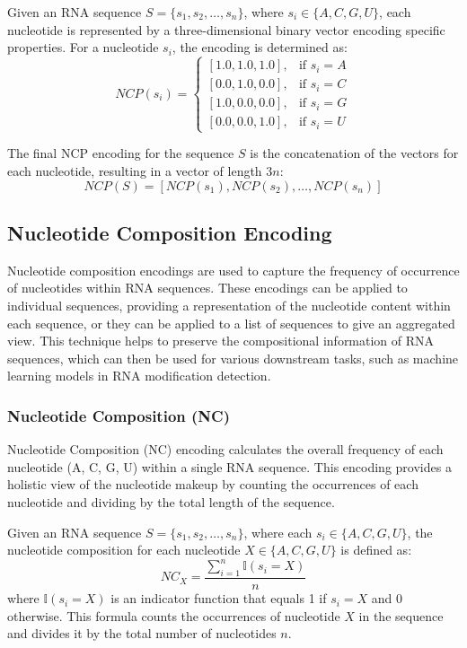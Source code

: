     Given an RNA sequence $S = \{s_1, s_2, \dots, s_n\}$, where $s_i \in \{A, C, G, U\}$, each nucleotide is represented by a three-dimensional binary vector encoding specific properties. For a nucleotide $s_i$, the encoding is determined as:
    \[
      NCP(s_i) = \begin{cases}
      [1.0, 1.0, 1.0]
                   , & \text{if } s_i = A \\
                   [0.0, 1.0, 0.0], & \text{if } s_i = C \\
                   [1.0, 0.0, 0.0], & \text{if } s_i = G \\
                   [0.0, 0.0, 1.0], & \text{if } s_i = U
      \end{cases}
    \]

    The final NCP encoding for the sequence $S$ is the concatenation of the vectors for each nucleotide, resulting in a vector of length $3n$:
    \[
      NCP(S) = [NCP(s_1), NCP(s_2), \dots, NCP(s_n)]
    \]

  \subsection{Nucleotide Composition Encoding}\label{subsec:nucleotide-composition-encoding}
    Nucleotide composition encodings are used to capture the frequency of occurrence of nucleotides within RNA sequences.
    These encodings can be applied to individual sequences, providing a representation of the nucleotide content within each sequence, or they can be applied to a list of sequences to give an aggregated view.
    This technique helps to preserve the compositional information of RNA sequences, which can then be used for various downstream tasks, such as machine learning models in RNA modification detection.

    \subsubsection{Nucleotide Composition (NC)}\label{subsubsec:nc}
      Nucleotide Composition (NC) encoding calculates the overall frequency of each nucleotide (A, C, G, U) within a single RNA sequence.
      This encoding provides a holistic view of the nucleotide makeup by counting the occurrences of each nucleotide and dividing by the total length of the sequence.

      Given an RNA sequence $S = \{s_1, s_2, \dots, s_n\}$, where each $s_i \in \{A, C, G, U\}$, the nucleotide composition for each nucleotide $X \in \{A, C, G, U\}$ is defined as:
      \[
        NC_X = \frac{\sum_{i=1}^{n} \mathbb{I}(s_i = X)}{n}
      \]
      where $\mathbb{I}(s_i = X)$ is an indicator function that equals 1 if $s_i = X$ and 0 otherwise.
      This formula counts the occurrences of nucleotide $X$ in the sequence and divides it by the total number of nucleotides $n$.

